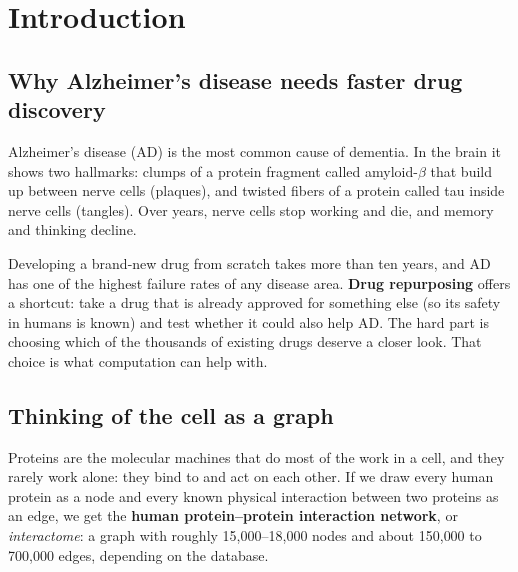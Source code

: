 \section{Introduction}

\subsection{Why Alzheimer's disease needs faster drug discovery}

Alzheimer's disease (AD) is the most common cause of dementia. In the brain it shows two hallmarks: clumps of a protein fragment called amyloid-$\beta$ that build up between nerve cells (plaques), and twisted fibers of a protein called tau inside nerve cells (tangles). Over years, nerve cells stop working and die, and memory and thinking decline.

Developing a brand-new drug from scratch takes more than ten years, and AD has one of the highest failure rates of any disease area. \textbf{Drug repurposing} offers a shortcut: take a drug that is already approved for something else (so its safety in humans is known) and test whether it could also help AD. The hard part is choosing which of the thousands of existing drugs deserve a closer look. That choice is what computation can help with.

\subsection{Thinking of the cell as a graph}

Proteins are the molecular machines that do most of the work in a cell, and they rarely work alone: they bind to and act on each other. If we draw every human protein as a node and every known physical interaction between two proteins as an edge, we get the \textbf{human protein--protein interaction network}, or \emph{interactome}: a graph with roughly 15{,}000--18{,}000 nodes and about 150{,}000 to 700{,}000 edges, depending on the database.

